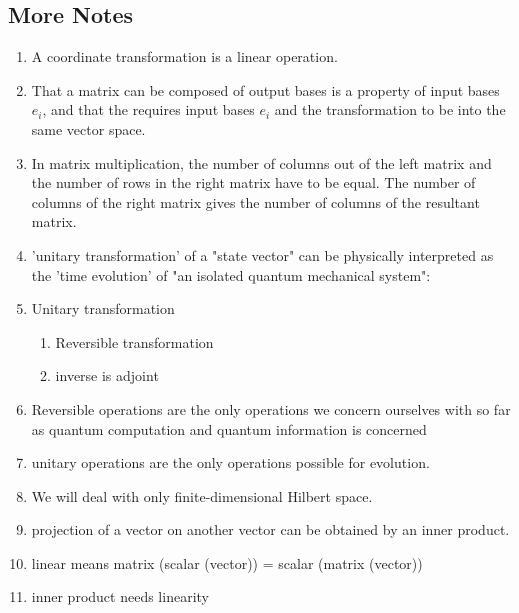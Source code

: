 \documentclass[14pt]{extarticle}
\begin{document}
\subsection{More Notes}
\begin{enumerate}
    \item A coordinate transformation is a linear operation.
    \item That a matrix can be composed of output bases is a property of input bases $e_i$, and that the requires input bases $e_i$ and the transformation to be into the same vector space.
    \item In matrix multiplication, the number of columns out of the left matrix and the number of rows in the right matrix have to be equal.
    \subitem The number of columns of the right matrix gives the number of columns of the resultant matrix.
    \item 'unitary transformation' of a "state vector" can be physically interpreted as the 'time evolution' of "an isolated quantum mechanical system":
    \item Unitary transformation
\begin{enumerate} %
    \item Reversible transformation
    \item inverse is adjoint
\end{enumerate}
   \item Reversible operations are the only operations we concern ourselves with so far as quantum computation and quantum information is concerned
   \item unitary operations are the only operations possible for evolution.
   \item We will deal with only finite-dimensional Hilbert space.
   \item projection of a vector on another vector can be obtained by an inner product. 
   \item linear means matrix (scalar (vector)) = scalar (matrix (vector))
   \item inner product needs linearity 
   
\end{enumerate}
\end{document}
